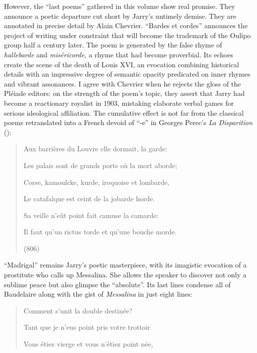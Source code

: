 \begin{review}
However, the ``last poems'' gathered in this volume show real promise.
They announce a poetic departure cut short by Jarry's untimely demise.
They are annotated in precise detail by Alain Chevrier. ``Bardes et
cordes'' announces the project of writing under constraint that will
become the trademark of the Oulipo group half a century later. The poem
is generated by the false rhyme of \emph{hallebarde} and
\emph{miséricorde,} a rhyme that had become proverbial. Its echoes
create the scene of the death of Louis XVI, an evocation combining
historical details with an impressive degree of semantic opacity
predicated on inner rhymes and vibrant assonances. I agree with Chevrier
when he rejects the gloss of the Pléiade editors: on the strength of the
poem's topic, they assert that Jarry had become a reactionary royalist
in 1903, mistaking elaborate verbal games for serious ideological
affiliation. The cumulative effect is not far from the classical poems
retranslated into a French devoid of ``-e'' in Georges Perec's \emph{La
Disparition} (\citeyear{perec_disparition_1969}):

\begin{quote}
Aux barrières du Louvre elle dormait, la garde:

Les palais sont de grands ports où la mort aborde;

Corse, kamoulcke, kurde, iroquoise et lombarde,

Le catafalque est ceint de la jobarde horde.

Sa veille n'eût point fait camuse la camarde:

Il faut qu'un rictus torde et qu'une bouche morde.

\begin{flushright}
 (806)   
\end{flushright}
\end{quote}

\noindent ``Madrigal'' remains Jarry's poetic masterpiece, with its imagistic
evocation of a prostitute who calls up Messalina. She allows the speaker
to discover not only a sublime peace but also glimpse the ``absolute''.
Its last lines condense all of Baudelaire along with the gist of
\emph{Messalina} in just eight lines:

\begin{quote}
Comment s'unit la double destinée?

Tant que je n'eus point pris votre trottoir

Vous étiez vierge et vous n'étiez point née,


\end{quote}
\end{review}
